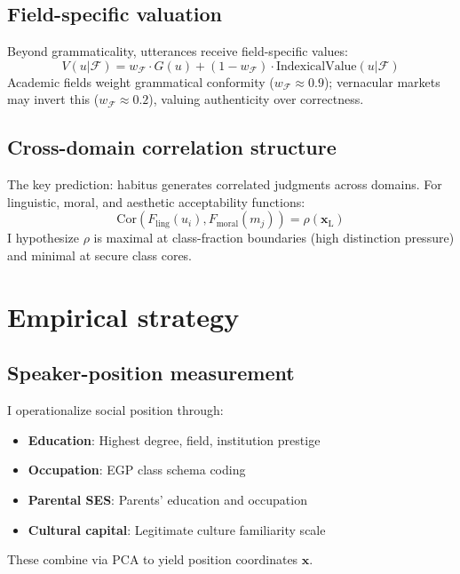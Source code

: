 \documentclass[12pt]{article}
\newcommand{\listener}{\mathrm{L}}
\begin{document}
\subsection{Field-specific valuation}

Beyond grammaticality, utterances receive field-specific values:
\begin{equation}
V(u|\mathcal{F}) = w_{\mathcal{F}} \cdot G(u) + (1-w_{\mathcal{F}}) \cdot \text{IndexicalValue}(u|\mathcal{F})
\end{equation}
Academic fields weight grammatical conformity ($w_{\mathcal{F}} \approx 0.9$); vernacular markets may invert this ($w_{\mathcal{F}} \approx 0.2$), valuing authenticity over correctness.

\subsection{Cross-domain correlation structure}

The key prediction: habitus generates correlated judgments across domains. For linguistic, moral, and aesthetic acceptability functions:
\begin{equation}
\text{Cor}(F_{\text{ling}}(u_i), F_{\text{moral}}(m_j)) = \rho(\mathbf{x}_{\listener})
\end{equation}
I hypothesize $\rho$ is maximal at class-fraction boundaries (high distinction pressure) and minimal at secure class cores.

\section{Empirical strategy}

\subsection{Speaker-position measurement}

I operationalize social position through:
\begin{itemize}
\item \textbf{Education}: Highest degree, field, institution prestige
\item \textbf{Occupation}: EGP class schema coding
\item \textbf{Parental SES}: Parents' education and occupation
\item \textbf{Cultural capital}: Legitimate culture familiarity scale \parencite{dimaggio1982}
\end{itemize}
These combine via PCA to yield position coordinates $\mathbf{x}$.
\end{document}
